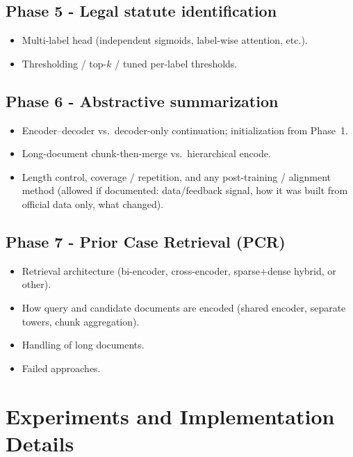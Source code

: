 \documentclass[11pt, oneside]{article}
\begin{document}
\subsection{Phase 5 - Legal statute identification}
\begin{itemize}[leftmargin=*]
    \item Multi-label head (independent sigmoids, label-wise attention, etc.).
    \item Thresholding / top-$k$ / tuned per-label thresholds.

\end{itemize}
\subsection{Phase 6 - Abstractive summarization}
\begin{itemize}[leftmargin=*]
    \item Encoder--decoder vs.\ decoder-only continuation; initialization from Phase~1.
    \item Long-document chunk-then-merge vs.\ hierarchical encode.
    \item Length control, coverage / repetition, and any post-training / alignment method (allowed if documented: data/feedback signal, how it was built from official data only, what changed).
\end{itemize}
\subsection{Phase 7 - Prior Case Retrieval (PCR)}
\begin{itemize}[leftmargin=*]
    \item Retrieval architecture (bi-encoder, cross-encoder, sparse+dense hybrid, or other). 
    \item How query and candidate documents are encoded (shared encoder, separate towers, chunk aggregation).
    \item Handling of long documents.
    \item Failed approaches.
\end{itemize}

\section{Experiments and Implementation Details}
\end{document}
